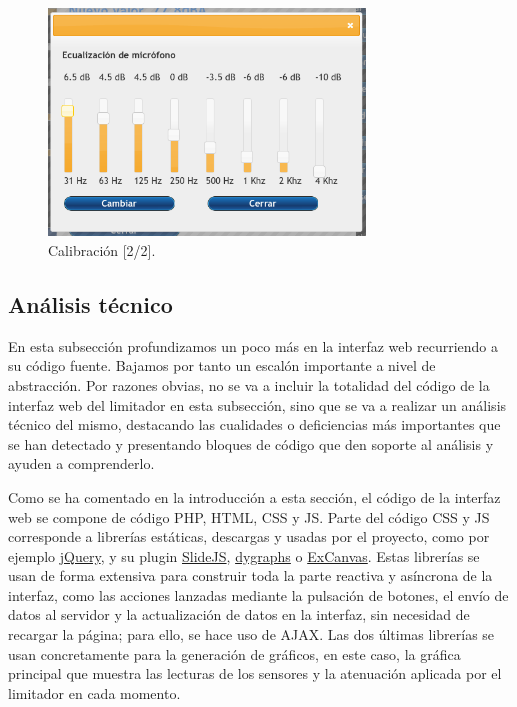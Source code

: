 \begin{figure}[ht]
    \centering
    \includegraphics[width=0.75\textwidth]{imagenes/interfaz/Interfaz_7_calibrar_1.png}
    \caption{Calibración [2/2].}
\end{figure}

\clearpage
\subsection{Análisis técnico}

En esta subsección profundizamos un poco más en la interfaz web recurriendo a su código fuente. Bajamos por tanto un escalón importante a nivel de abstracción. Por razones obvias, no se va a incluir la totalidad del código de la interfaz web del limitador en esta subsección, sino que se va a realizar un análisis técnico del mismo, destacando las cualidades o deficiencias más importantes que se han detectado y presentando bloques de código que den soporte al análisis y ayuden a comprenderlo.


Como se ha comentado en la introducción a esta sección, el código de la interfaz web se compone de código PHP, HTML, CSS y JS. Parte del código CSS y JS corresponde a librerías estáticas, descargas y usadas por el proyecto, como por ejemplo \href{https://jquery.com/}{jQuery}, y su plugin \href{https://nathansearles.github.io/slidesjs/}{SlideJS}, \href{https://dygraphs.com/}{dygraphs} o \href{https://github.com/arv/explorercanvas}{ExCanvas}. Estas librerías se usan de forma extensiva para construir toda la parte reactiva y asíncrona de la interfaz, como las acciones lanzadas mediante la pulsación de botones, el envío de datos al servidor y la actualización de datos en la interfaz, sin necesidad de recargar la página; para ello, se hace uso de AJAX. Las dos últimas librerías se usan concretamente para la generación de gráficos, en este caso, la gráfica principal que muestra las lecturas de los sensores y la atenuación aplicada por el limitador en cada momento.

